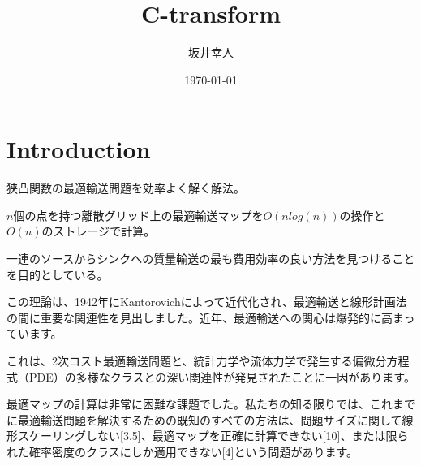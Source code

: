\documentclass{jsarticle}
\title{C-transform}
\author{坂井幸人}
\date{\today}
\theoremstyle{definition}
\begin{document}
\maketitle

\section{Introduction}
狭凸関数の最適輸送問題を効率よく解く解法。

$n$個の点を持つ離散グリッド上の最適輸送マップを$O(n log(n))$の操作と$O(n)$のストレージで計算。

一連のソースからシンクへの質量輸送の最も費用効率の良い方法を見つけることを目的としている。

この理論は、1942年にKantorovichによって近代化され、最適輸送と線形計画法の間に重要な関連性を見出しました。近年、最適輸送への関心は爆発的に高まっています。

これは、2次コスト最適輸送問題と、統計力学や流体力学で発生する偏微分方程式（PDE）の多様なクラスとの深い関連性が発見されたことに一因があります。

最適マップの計算は非常に困難な課題でした。私たちの知る限りでは、これまでに最適輸送問題を解決するための既知のすべての方法は、問題サイズに関して線形スケーリングしない[3,5]、最適マップを正確に計算できない[10]、または限られた確率密度のクラスにしか適用できない[4]という問題があります。
\subsection{}
\end{document}
